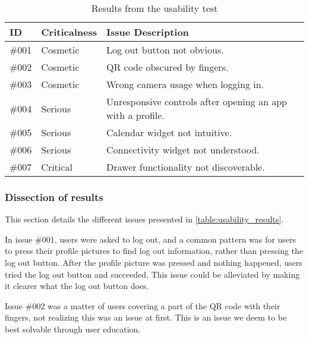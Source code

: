 \begin{table}[ht]
\caption{Results from the usability test} %
\centering  %
\begin{tabular}{| l | l | p{3in} |}
\hline
\textbf{ID} & \textbf{Criticalness} & \textbf{Issue Description} \\ [0.5ex] %
\hline                  %
\#{}001 & Cosmetic & Log out button not obvious. \\ \hline 
\#{}002 & Cosmetic & QR code obscured by fingers. \\ \hline 
\#{}003 & Cosmetic & Wrong camera usage when logging in. \\ \hline
\#{}004 & Serious & Unresponsive controls after opening an app with a profile. \\ \hline
\#{}005 & Serious & Calendar widget not intuitive. \\ \hline
\#{}006 & Serious & Connectivity widget not understood. \\ \hline
\#{}007 & Critical & Drawer functionality not discoverable. \\ [1ex]      %
\hline %
\end{tabular}
\label{table:usability_results} %
\end{table}

\subsubsection{Dissection of results}
This section details the different issues presented in \autoref{table:usability_results}. \newline

In issue \#{}001, users were asked to log out, and a common pattern was for users to press their profile pictures to find log out information, rather than pressing the log out button. 
After the profile picture was pressed and nothing happened, users tried the log out button and succeeded. 
This issue could be alleviated by making it clearer what the log out button does. \newline

Issue \#{}002 was a matter of users covering a part of the QR code with their fingers, not realizing this was an issue at first. 
This is an issue we deem to be best solvable through user education. \newline


